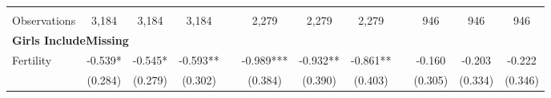 \begin{landscape}
\begin{table}[htpb!]
\begin{center}
\begin{tabular}{lcccp{2mm}cccp{2mm}ccc}
\begin{footnotesize}\end{footnotesize}&\begin{footnotesize}\end{footnotesize}&\begin{footnotesize}\end{footnotesize}&\begin{footnotesize}\end{footnotesize}&\begin{footnotesize}\end{footnotesize}&\begin{footnotesize}\end{footnotesize}&\begin{footnotesize}\end{footnotesize}&\begin{footnotesize}\end{footnotesize}&\begin{footnotesize}\end{footnotesize}&\begin{footnotesize}\end{footnotesize}&\begin{footnotesize}\end{footnotesize}&\begin{footnotesize}\end{footnotesize}\\Observations&3,184&3,184&3,184&&2,279&2,279&2,279&&946&946&946\\
\multicolumn{12}{l}{\textbf{Girls IncludeMissing}}\\ 
Fertility&-0.539*&-0.545*&-0.593**&&-0.989***&-0.932**&-0.861**&&-0.160&-0.203&-0.222\\
&(0.284)&(0.279)&(0.302)&&(0.384)&(0.390)&(0.403)&&(0.305)&(0.334)&(0.346)\\

\end{tabular}
\end{center}
\end{table}
\end{landscape}
